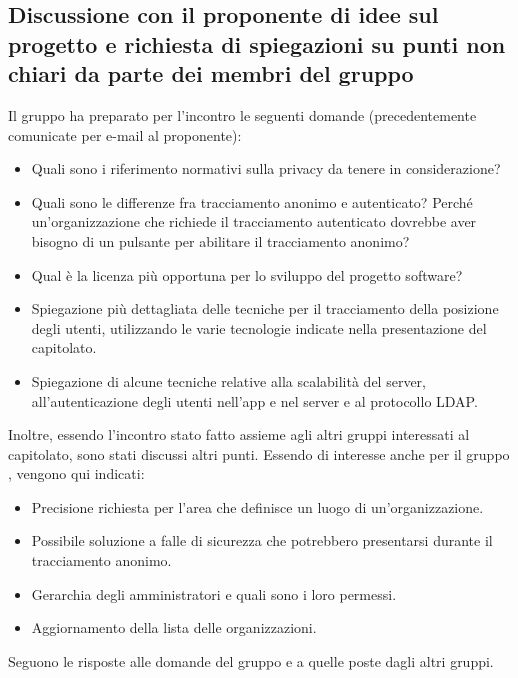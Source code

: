 \subsection{Discussione con il proponente di idee sul progetto \NomeProgetto{} e richiesta di spiegazioni su punti non chiari da parte dei membri del gruppo}
Il gruppo ha preparato per l'incontro le seguenti domande (precedentemente comunicate per e-mail al proponente):
\begin{itemize}
	\item Quali sono i riferimento normativi sulla privacy da tenere in considerazione?
	\item Quali sono le differenze fra tracciamento anonimo e autenticato? Perché un'organizzazione che richiede il tracciamento autenticato dovrebbe aver bisogno di un pulsante per abilitare il tracciamento anonimo?
	\item Qual è la licenza più opportuna per lo sviluppo del progetto software?
	\item Spiegazione più dettagliata delle tecniche per il tracciamento della posizione degli utenti, utilizzando le varie tecnologie indicate nella presentazione del capitolato.
	\item Spiegazione di alcune tecniche relative alla scalabilità del server, all'autenticazione degli utenti nell'app e nel server e al protocollo LDAP.
\end{itemize}
Inoltre, essendo l'incontro stato fatto assieme agli altri gruppi interessati al capitolato, sono stati discussi altri punti. Essendo di interesse anche per il gruppo \Gruppo{}, vengono qui indicati:
\begin{itemize}
	\item Precisione richiesta per l'area che definisce un luogo di un'organizzazione.
	\item Possibile soluzione a falle di sicurezza che potrebbero presentarsi durante il tracciamento anonimo.
	\item Gerarchia degli amministratori e quali sono i loro permessi.
	\item Aggiornamento della lista delle organizzazioni.
\end{itemize}
Seguono le risposte alle domande del gruppo e a quelle poste dagli altri gruppi.

